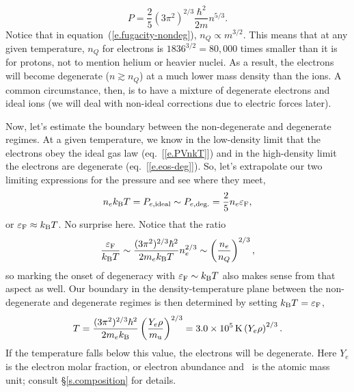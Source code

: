 \begin{equation}\label{e.eos-deg}
P = \frac{2}{5}\left(3\pi^{2}\right)^{2/3}\frac{\hbar^{2}}{2m}n^{5/3}.
\end{equation}
Notice that in equation~(\ref{e.fugacity-nondeg}), $n_{Q}\propto m^{3/2}$.  This means that at any given temperature, $n_{Q}$ for electrons is $1836^{3/2} = 80,000$ times smaller than it is for protons, not to mention helium or heavier nuclei. As a result, the electrons will become degenerate ($n\gtrsim n_{Q}$) at a much lower mass density than the ions.    A common circumstance, then, is to have a mixture of degenerate electrons and ideal ions (we will deal with non-ideal corrections due to electric forces later).  

Now, let's estimate the boundary between the non-degenerate and degenerate regimes. At a given temperature, we know in the low-density limit that the electrons obey the ideal gas law (eq.~[\ref{e.PVnkT}]) and in the high-density limit the electrons are degenerate (eq.~[\ref{e.eos-deg}]). So, let's extrapolate our two limiting expressions for the pressure and see where they meet,
\begin{equation}
n_{e}k_\mathrm{B} T = P_{e,\mathrm{ideal}} \sim P_{e,\mathrm{deg.}} 
  = \frac{2}{5}n_{e}\varepsilon_{\mathrm{F}},
\end{equation}
or $\varepsilon_{\mathrm{F}} \approx k_\mathrm{B} T$.  No surprise here.  Notice that the ratio
\begin{equation}
\frac{\varepsilon_{\mathrm{F}}}{k_\mathrm{B} T} \sim \frac{(3\pi^{2})^{2/3}\hbar^{2}}{2m_{e}k_\mathrm{B} T}n_{e}^{2/3} \sim \left(\frac{n_{e}}{n_{Q}}\right)^{2/3},
\end{equation}
so marking the onset of degeneracy with $\varepsilon_{\mathrm{F}}\sim k_\mathrm{B} T$ also makes sense from that aspect as well. Our boundary in the density-temperature plane between the non-degenerate and degenerate regimes is then determined by setting $k_\mathrm{B} T = \varepsilon_{\mathrm{F}}$,
\begin{equation}\label{e.TF}
T = \frac{(3\pi^{2})^{2/3}\hbar^{2}}{2m_{e}k_\mathrm{B} }\left(\frac{Y_{e}\rho}{m_\mathrm{u}}\right)^{2/3} = 3.0\times 10^{5}\,\mathrm{K} \left(Y_{e}\rho\right)^{2/3}.
\end{equation}
If the temperature falls below this value, the electrons will be degenerate. Here $Y_{e}$ is the electron molar fraction, or electron abundance and \mb\ is the atomic mass unit; consult \S\ref{s.composition} for details.

